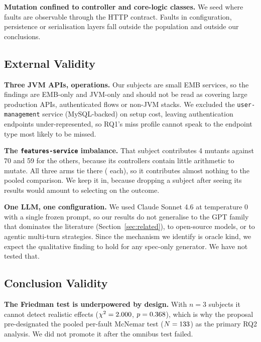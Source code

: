 \textbf{Mutation confined to controller and core-logic classes.} We seed where faults are
observable through the HTTP contract. Faults in configuration, persistence or serialisation
layers fall outside the population and outside our conclusions.

\subsection{External Validity}

\textbf{Three JVM APIs, \RQIopsTotal{} operations.} Our subjects are small EMB services, so the
findings are EMB-only and JVM-only and should not be read as covering large production APIs,
authenticated flows or non-JVM stacks. We excluded the \texttt{user-management} service
(MySQL-backed) on setup cost, leaving authentication endpoints under-represented, so RQ1's
miss profile cannot speak to the endpoint type most likely to be missed.

\textbf{The \texttt{features-service} imbalance.} That subject contributes 4 mutants against 70
and 59 for the others, because its controllers contain little arithmetic to mutate. All three
arms tie there (\RQIIFeaturesLlm{} each), so it contributes almost nothing to the pooled
comparison. We keep it in, because dropping a subject after seeing its results would amount
to selecting on the outcome.

\textbf{One LLM, one configuration.} We used Claude Sonnet 4.6 at temperature 0 with a single
frozen prompt, so our results do not generalise to the GPT family that dominates the literature
(Section~\ref{sec:related}), to open-source models, or to agentic multi-turn strategies. Since
the mechanism we identify is oracle kind, we expect the qualitative finding to hold for any
spec-only generator. We have not tested that.

\subsection{Conclusion Validity}

\textbf{The Friedman test is underpowered by design.} With $n=3$ subjects it cannot detect
realistic effects ($\chi^2=2.000$, $p=0.368$), which is why the proposal
pre-designated the pooled per-fault McNemar test ($N=133$) as the primary RQ2 analysis. We
did not promote it after the omnibus test failed.

